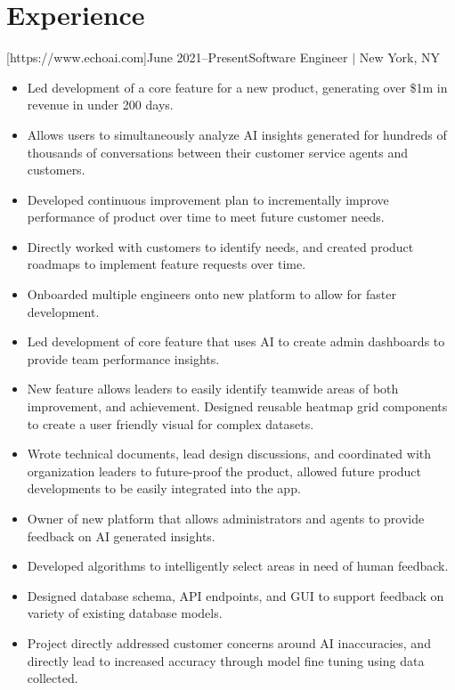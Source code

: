\documentclass[letterpaper,11pt]{article}
\newcommand{\Item}[1]{
  \item\small{
    \parbox[t]{500pt}{\raggedright#1}
  }
}
\newenvironment{HeadingList}{
  \begin{mdframed}[
    topline=false,
    bottomline=false,
    rightline=false,
    leftline=false,
    linecolor=gray,
    linewidth=0pt,
    leftmargin=0pt,
    innerleftmargin=0pt,
    innertopmargin=0pt,
    innerbottommargin=0pt,
    innerrightmargin=0pt,
    skipabove=\parsep,
    skipbelow=\parsep,
  ]
  \begin{itemize}[leftmargin=0pt, label={}]
}{
  \end{itemize}
  \end{mdframed}
}
\newenvironment{SubHeadingList}{
  \begin{mdframed}[
    leftline=true,
    linecolor=gray,
    linewidth=.5pt,
    leftmargin=8pt,
    innerleftmargin=8pt,
  ]
  \begin{itemize}[leftmargin=0pt, label={}]
}{
  \end{itemize}
  \end{mdframed}
}
\newenvironment{ItemList}{
  \begin{itemize}[itemsep=4pt, topsep=-3pt, partopsep=0pt, parsep=0pt, leftmargin=20pt, label=\raisebox{0.4ex}{\scalebox{0.5}{\textbullet}}]
}{\end{itemize}}
\begin{document}



\section{Experience}
    \begin{HeadingList}
        [https://www.echoai.com]{June 2021--Present}{Software Engineer $|$ New York, NY}
            \begin{SubHeadingList}

                \begin{ItemList}
                    \Item{Led development of a core feature for a new product, generating over \$1m in revenue in under 200 days.}
                    \Item{Allows users to simultaneously analyze AI insights generated for hundreds of thousands of conversations between their customer service agents and customers.}
                    \Item{Developed continuous improvement plan to incrementally improve performance of product over time to meet future customer needs.}
                    \Item{Directly worked with customers to identify needs, and created product roadmaps to implement feature requests over time.}
                    \Item{Onboarded multiple engineers onto new platform to allow for faster development.}
                \end{ItemList}

                \begin{ItemList}
                    \Item{Led development of core feature that uses AI to create admin dashboards to provide team performance insights.}
                    \Item{New feature allows leaders to easily identify teamwide areas of both improvement, and achievement. Designed reusable heatmap grid components to create a user friendly visual for complex datasets.}
                    \Item{Wrote technical documents, lead design discussions, and coordinated with organization leaders to future-proof the product, allowed future product developments to be easily integrated into the app.}
                \end{ItemList}

                \begin{ItemList}
                    \Item{Owner of new platform that allows administrators and agents to provide feedback on AI generated insights.}
                    \Item{Developed algorithms to intelligently select areas in need of human feedback.}
                    \Item{Designed database schema, API endpoints, and GUI to support feedback on variety of existing database models.}
                    \Item{Project directly addressed customer concerns around AI inaccuracies, and directly lead to increased accuracy through model fine tuning using data collected.}
                \end{ItemList}


\end{SubHeadingList}
\end{HeadingList}
\end{document}
